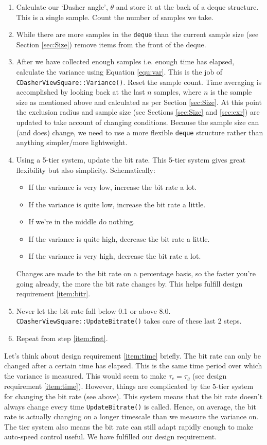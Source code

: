 \documentclass[a4paper,11pt,notitlepage]{article}
\begin{document}
\begin{enumerate}
\item\label{item:first} Calculate our `Dasher angle', $\theta$ and
store it at the back of a deque structure. This is a single
sample. Count the number of samples we take.
\item While there are more samples in the \texttt{deque} than the current
sample size (see Section \ref{sec:Size}) remove items from the front
of the deque.
\item After we have collected enough samples i.e. enough time has
elapsed, calculate the variance using Equation \ref{equ:var}. This is
the job of \texttt{CDasherViewSquare::Variance()}. Reset the sample
count. Time averaging is accomplished by looking back at the last $n$
samples, where $n$ is the sample size as mentioned above and
calculated as per Section \ref{sec:Size}. At this point the exclusion
radius and sample size (see Sections \ref{sec:Size} and \ref{sec:exr})
are updated to take account of changing conditions. Because the sample
size can (and does) change, we need to use a more flexible
\texttt{deque} structure rather than anything simpler/more
lightweight.
\item Using a 5-tier system, update the bit rate. This 5-tier system
gives great flexibility but also simplicity. Schematically:
\begin{itemize}
\item If the variance is very low, increase the bit rate a lot.
\item If the variance is quite low, increase the bit rate a little.
\item If we're in the middle do nothing.
\item If the variance is quite high, decrease the bit rate a little.
\item If the variance is very high, decrease the bit rate a lot.
\end{itemize}
Changes are made to the bit rate on a percentage basis, so the faster
you're going already, the more the bit rate changes by. This helps
fulfill design requirement \ref{item:bitr}.
\item Never let the bit rate fall below 0.1 or above
  8.0. \texttt{CDasherViewSquare::UpdateBitrate()} takes care of these
  last 2 steps.
\item Repeat from step \ref{item:first}.
\end{enumerate}

Let's think about design requirement \ref{item:time} briefly. The bit
rate can only be changed after a certain time has elapsed. This is the
same time period over which the variance is measured. This would seem
to make $\tau_c = \tau_g$ (see design requirement
\ref{item:time}). However, things are complicated by the 5-tier system
for changing the bit rate (see above). This system means that the bit
rate doesn't always change every time \texttt{UpdateBitrate()} is
called. Hence, on average, the bit rate is actually changing on a
longer timescale than we measure the variance on. The tier system also
means the bit rate can still adapt rapidly enough to make auto-speed
control useful. We have fulfilled our design requirement.
\end{document}
